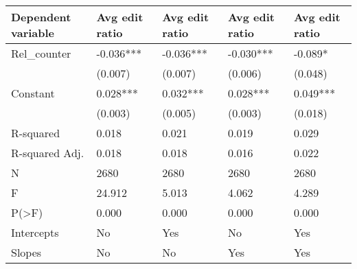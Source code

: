 \begin{tabular}{lllll}
\toprule
Dependent variable & Avg edit ratio & Avg edit ratio & Avg edit ratio & Avg edit ratio \\
\midrule
Rel\_counter    &      -0.036*** &      -0.036*** &      -0.030*** &        -0.089* \\
               &        (0.007) &        (0.007) &        (0.006) &        (0.048) \\
Constant       &       0.028*** &       0.032*** &       0.028*** &       0.049*** \\
               &        (0.003) &        (0.005) &        (0.003) &        (0.018) \\
R-squared      &          0.018 &          0.021 &          0.019 &          0.029 \\
R-squared Adj. &          0.018 &          0.018 &          0.016 &          0.022 \\
N              &           2680 &           2680 &           2680 &           2680 \\
F              &         24.912 &          5.013 &          4.062 &          4.289 \\
P(>F)          &          0.000 &          0.000 &          0.000 &          0.000 \\
Intercepts     &             No &            Yes &             No &            Yes \\
Slopes         &             No &             No &            Yes &            Yes \\
\bottomrule
\end{tabular}
